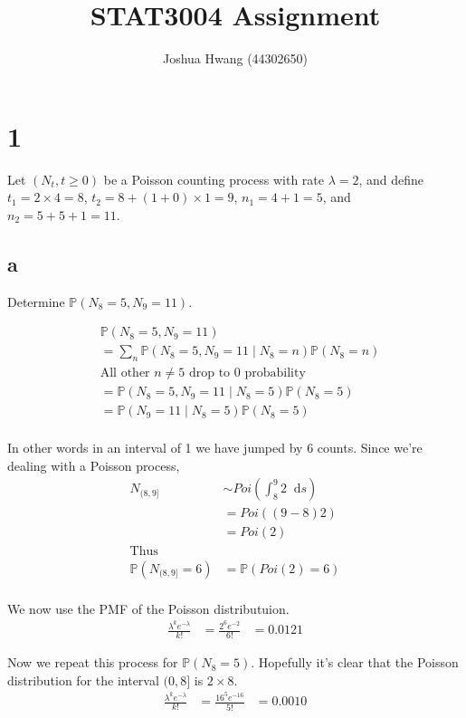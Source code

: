 \documentclass{article}
\title{STAT3004 Assignment}
\author{Joshua Hwang (44302650)}
\newcommand{\diff}{\mathop{}\!\mathrm{d}}
\newcommand{\prob}{\mathbb{P}}
\begin{document}
\maketitle
\section{1}
Let $(N_t, t \geq 0)$ be a Poisson counting process with rate
$\lambda = 2$, and define 
$t_1 = 2 \times 4 = 8$, 
$t_2 = 8 + (1 + 0) \times 1 = 9$,
$n_1 = 4 + 1 = 5$, and 
$n_2 = 5 + 5 + 1 = 11$.

\subsection{a}
Determine $\prob(N_8 = 5, N_9 = 11)$.

\begin{align*}
    &\prob(N_8 = 5, N_9 = 11) \\
    &= \sum_n \prob(N_8 = 5, N_9 = 11 \;|\; N_8 = n) \prob(N_8 = n) \\
    &\text{All other $n \neq 5$ drop to 0 probability} \\
    &= \prob(N_8 = 5, N_9 = 11 \;|\; N_8 = 5) \prob(N_8 = 5) \\
    &= \prob(N_9 = 11 \;|\; N_8 = 5) \prob(N_8 = 5) \\
\end{align*}

In other words in an interval of 1 we have jumped by 6 counts. Since we're
dealing with a Poisson process,
\begin{align*}
    N_{(8, 9]} &\sim Poi\left(\int_8^9 2 \diff s\right) \\
    &= Poi((9-8)2) \\
    &= Poi(2) \\
    \text{Thus} \\
    \prob\left(N_{(8, 9]} = 6\right) &= \prob(Poi(2) = 6) \\
\end{align*}

We now use the PMF of the Poisson distributuion.
\begin{align*}
    \frac{\lambda^k e^{-\lambda}}{k!}
    &= \frac{2^6 e^{-2}}{6!}
    &= 0.0121
\end{align*}

Now we repeat this process for $\prob(N_8 = 5)$. Hopefully it's clear that the
Poisson distribution for the interval $(0,8]$ is $2 \times 8$.
\begin{align*}
    \frac{\lambda^k e^{-\lambda}}{k!}
    &= \frac{16^5 e^{-16}}{5!}
    &= 0.0010
\end{align*}
\end{document}
